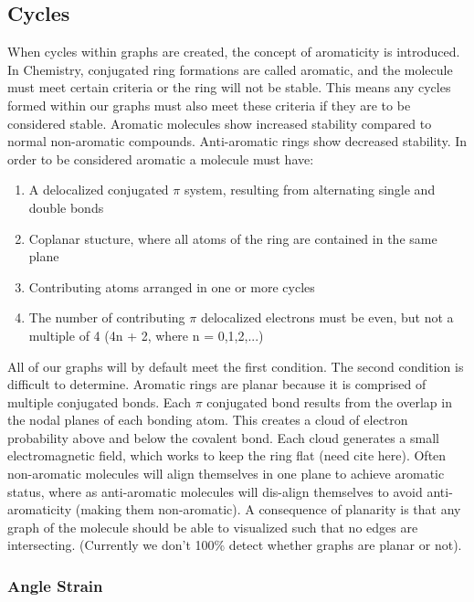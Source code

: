 \documentclass[12pt]{article}
\begin{document}
\subsection{Cycles}
When cycles within graphs are created, the concept of aromaticity is introduced. In Chemistry, conjugated ring formations are called aromatic, and the molecule must meet certain criteria or the ring will not be stable. This means any cycles formed within our graphs must also meet these criteria if they are to be considered stable. Aromatic molecules show increased stability compared to normal non-aromatic compounds. Anti-aromatic rings show decreased stability. In order to be considered aromatic a molecule must have:

\begin{enumerate}
\item{A delocalized conjugated $\pi$ system, resulting from alternating single and double bonds}
\item{Coplanar stucture, where all atoms of the ring are contained in the same plane}
\item{Contributing atoms arranged in one or more cycles}
\item{The number of contributing $\pi$ delocalized electrons must be even, but not a multiple of 4 (4n + 2, where n = 0,1,2,...)}
\end{enumerate}

All of our graphs will by default meet the first condition. The second condition is difficult to determine. Aromatic rings are planar because it is comprised of multiple conjugated bonds. Each $\pi$ conjugated bond results from the overlap in the nodal planes of each bonding atom. This creates a cloud of electron probability above and below the covalent bond. Each cloud generates a small electromagnetic field, which works to keep the ring flat (need cite here). Often non-aromatic molecules will align themselves in one plane to achieve aromatic status, where as anti-aromatic molecules will dis-align themselves to avoid anti-aromaticity (making them non-aromatic). A consequence of planarity is that any graph of the molecule should be able to visualized such that no edges are intersecting. (Currently we don't 100\% detect whether graphs are planar or not).

\subsubsection{Angle Strain}
\end{document}
